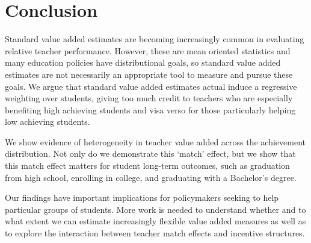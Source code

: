 \documentclass[letterpaper,12pt]{article}
\begin{document}




\section{Conclusion}\label{sec: Conclusion}

Standard value added estimates are becoming increasingly common in evaluating relative teacher performance. However, these are mean oriented statistics and many education policies have distributional goals, so standard value added estimates are not necessarily an appropriate tool to measure and pursue these goals. We argue that standard value added estimates actual induce a regressive weighting over students, giving too much credit to teachers who are especially benefiting high achieving students and visa verso for those particularly helping low achieving students.

We show evidence of heterogeneity in teacher value added across the achievement distribution. Not only do we demonstrate this `match' effect, but we show that this match effect matters for student long-term outcomes, such as graduation from high school, enrolling in college, and graduating with a Bachelor's degree.

Our findings have important implications for policymakers seeking to help particular groups of students. More work is needed to understand whether and to what extent we can estimate increasingly flexible value added measures as well as to explore the interaction between teacher match effects and incentive structures.






\end{document}
